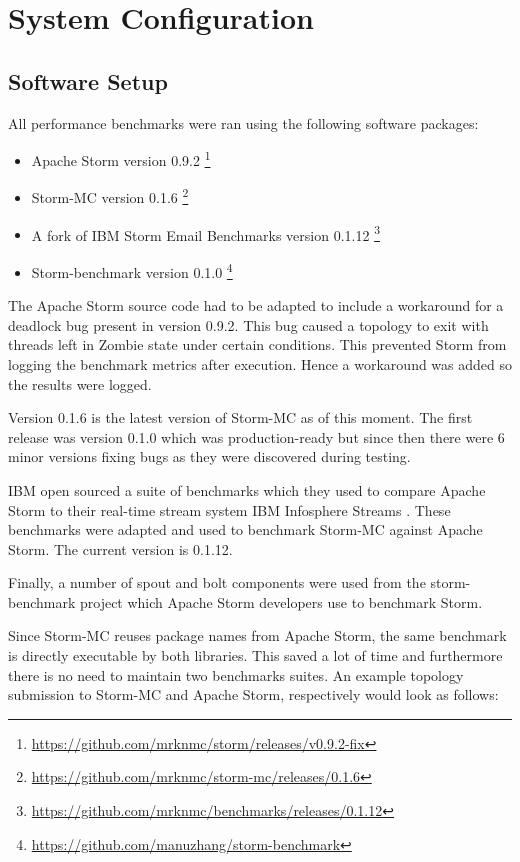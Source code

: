 \documentclass[bsc,logo,frontabs,twoside,singlespacing,normalheadings,parskip]{infthesis}\usepackage[]{graphicx}\usepackage[]{color}
\begin{document}
\section{System Configuration}
\label{sec:system_conf}

\subsection{Software Setup}

All performance benchmarks were ran using the following software packages:

\begin{itemize}
	\item Apache Storm version 0.9.2 \footnote{\url{https://github.com/mrknmc/storm/releases/v0.9.2-fix}}
	\item Storm-MC version 0.1.6 \footnote{\url{https://github.com/mrknmc/storm-mc/releases/0.1.6}}
	\item A fork of IBM Storm Email Benchmarks version 0.1.12 \footnote{\url{https://github.com/mrknmc/benchmarks/releases/0.1.12}}
	\item Storm-benchmark version 0.1.0 \footnote{\url{https://github.com/manuzhang/storm-benchmark}}
\end{itemize}

The Apache Storm source code had to be adapted to include a workaround for a deadlock bug present in version 0.9.2. This bug caused a topology to exit with threads left in Zombie state under certain conditions. This prevented Storm from logging the benchmark metrics after execution. Hence a workaround was added so the results were logged.

Version 0.1.6 is the latest version of Storm-MC as of this moment. The first release was version 0.1.0 which was production-ready but since then there were 6 minor versions fixing bugs as they were discovered during testing.

IBM open sourced a suite of benchmarks which they used to compare Apache Storm to their real-time stream system IBM Infosphere Streams \citep{InfoSphereStreams}. These benchmarks were adapted and used to benchmark Storm-MC against Apache Storm. The current version is 0.1.12.

Finally, a number of spout and bolt components were used from the storm-benchmark project which Apache Storm developers use to benchmark Storm.

Since Storm-MC reuses package names from Apache Storm, the same benchmark is directly executable by both libraries. This saved a lot of time and furthermore there is no need to maintain two benchmarks suites. An example topology submission to Storm-MC and Apache Storm, respectively would look as follows:
\end{document}

